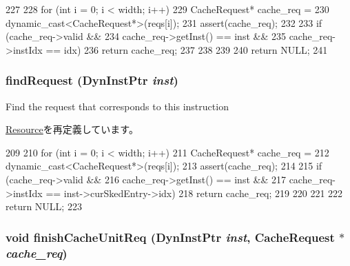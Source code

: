 \begin{DoxyCode}
227 {
228     for (int i = 0; i < width; i++) {
229         CacheRequest* cache_req =
230             dynamic_cast<CacheRequest*>(reqs[i]);
231         assert(cache_req);
232 
233         if (cache_req->valid &&
234             cache_req->getInst() == inst &&
235             cache_req->instIdx == idx) {
236             return cache_req;
237         }
238     }
239 
240     return NULL;
241 }
\end{DoxyCode}
\hypertarget{classCacheUnit_ae3afc1c63d17a49a6301bd18fca574a0}{
\subsubsection[{findRequest}]{ findRequest ({\bf DynInstPtr} {\em inst})}}
\label{classCacheUnit_ae3afc1c63d17a49a6301bd18fca574a0}
Find the request that corresponds to this instruction 

\hyperlink{classResource_ae3afc1c63d17a49a6301bd18fca574a0}{Resource}を再定義しています。


\begin{DoxyCode}
209 {
210     for (int i = 0; i < width; i++) {
211         CacheRequest* cache_req =
212             dynamic_cast<CacheRequest*>(reqs[i]);
213         assert(cache_req);
214 
215         if (cache_req->valid &&
216             cache_req->getInst() == inst &&
217             cache_req->instIdx == inst->curSkedEntry->idx) {
218             return cache_req;
219         }
220     }
221 
222     return NULL;
223 }
\end{DoxyCode}
\hypertarget{classCacheUnit_aea41ebe99227291877a80081e9b47822}{
\subsubsection[{finishCacheUnitReq}]{\setlength{\rightskip}{0pt plus 5cm}void finishCacheUnitReq ({\bf DynInstPtr} {\em inst}, \/  {\bf CacheRequest} $\ast$ {\em cache\_\-req})}}
\label{classCacheUnit_aea41ebe99227291877a80081e9b47822}



